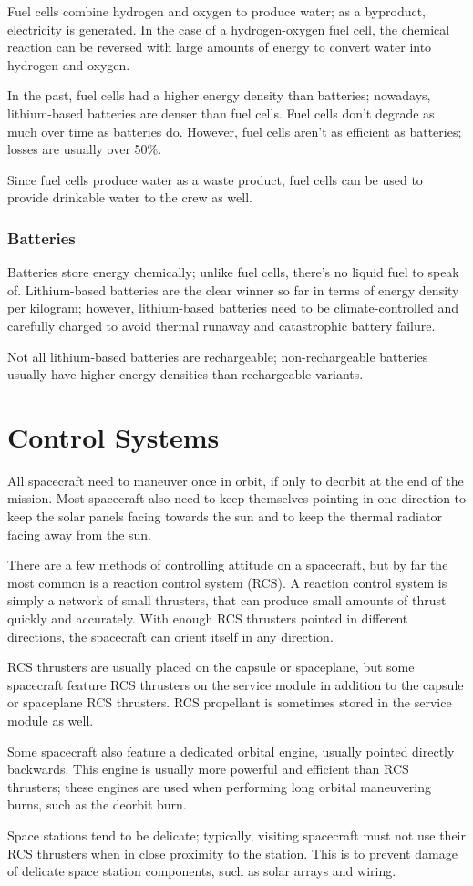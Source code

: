 Fuel cells combine hydrogen and oxygen to produce water; as a
byproduct, electricity is generated. In the case of a hydrogen-oxygen
fuel cell, the chemical reaction can be reversed with large amounts of
energy to convert water into hydrogen and oxygen.

In the past, fuel cells had a higher energy density than batteries;
nowadays, lithium-based batteries are denser than fuel cells. Fuel
cells don't degrade as much over time as batteries do. However, fuel
cells aren't as efficient as batteries; losses are usually over 50\%.

Since fuel cells produce water as a waste product, fuel cells can be
used to provide drinkable water to the crew as well.

\subsubsection{Batteries}

Batteries store energy chemically; unlike fuel cells, there's no
liquid fuel to speak of. Lithium-based batteries are the clear winner
so far in terms of energy density per kilogram; however, lithium-based
batteries need to be climate-controlled and carefully charged to avoid
thermal runaway and catastrophic battery failure.

Not all lithium-based batteries are rechargeable; non-rechargeable
batteries usually have higher energy densities than rechargeable
variants.

\section{Control Systems}

All spacecraft need to maneuver once in orbit, if only to deorbit at
the end of the mission. Most spacecraft also need to keep themselves
pointing in one direction to keep the solar panels facing towards the
sun and to keep the thermal radiator facing away from the sun.

There are a few methods of controlling attitude on a spacecraft, but
by far the most common is a reaction control system (RCS). A reaction
control system is simply a network of small thrusters, that can
produce small amounts of thrust quickly and accurately. With enough
RCS thrusters pointed in different directions, the spacecraft can
orient itself in any direction.

RCS thrusters are usually placed on the capsule or spaceplane, but
some spacecraft feature RCS thrusters on the service module in
addition to the capsule or spaceplane RCS thrusters. RCS propellant is
sometimes stored in the service module as well.

Some spacecraft also feature a dedicated orbital engine, usually
pointed directly backwards. This engine is usually more powerful and
efficient than RCS thrusters; these engines are used when performing
long orbital maneuvering burns, such as the deorbit burn.

Space stations tend to be delicate; typically, visiting spacecraft
must not use their RCS thrusters when in close proximity to the
station. This is to prevent damage of delicate space station
components, such as solar arrays and wiring.
